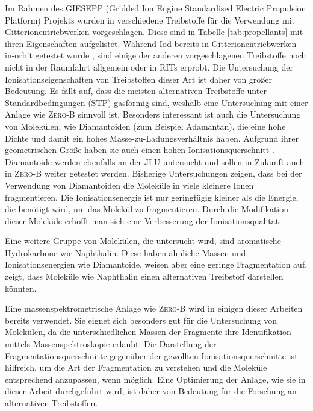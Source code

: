 Im Rahmen des GIESEPP (Gridded Ion Engine Standardised Electric Propulsion Platform) Projekts wurden in \cite{Prop} verschiedene Treibstoffe für die Verwendung mit Gitterionentriebwerken vorgeschlagen. Diese sind in Tabelle \ref{tab:propellants} mit ihren Eigenschaften aufgelistet. Während Iod bereits in Gitterionentriebwerken in-orbit getestet wurde \cite{Iodine}, sind einige der anderen vorgeschlagenen Treibstoffe noch nicht in der Raumfahrt allgemein oder in RITs erprobt. Die Untersuchung der Ionisationseigenschaften von Treibstoffen dieser Art ist daher von großer Bedeutung. Es fällt auf, dass die meisten alternativen Treibstoffe unter Standardbedingungen (STP) gasförmig sind, weshalb eine Untersuchung mit einer Anlage wie \textsc{Zero-B} sinnvoll ist. Besonders interessant ist auch die Untersuchung von Molekülen, wie Diamantoiden (zum Beispiel Adamantan), die eine hohe Dichte und damit ein hohes Masse-zu-Ladungsverhältnis haben. Aufgrund ihrer geometrischen Größe haben sie auch einen hohen Ionisationsquerschnitt \cite{ion}. Diamantoide werden ebenfalls an der JLU untersucht \cite{diamondoids} und sollen in Zukunft auch in \textsc{Zero-B} weiter getestet werden. Bisherige Untersuchungen zeigen, dass bei der Verwendung von Diamantoiden die Moleküle in viele kleinere Ionen fragmentieren. Die Ionisationsenergie ist nur geringfügig kleiner als die Energie, die benötigt wird, um das Molekül zu fragmentieren. Durch die Modifikation dieser Moleküle erhofft man sich eine Verbesserung der Ionisationsqualität. 

Eine weitere Gruppe von Molekülen, die untersucht wird, sind aromatische Hydrokarbone wie Naphthalin. Diese haben ähnliche Massen und Ionisationsenergien wie Diamantoide, weisen aber eine geringe Fragmentation auf. \cite{hydrocarbons} zeigt, dass Moleküle wie Naphthalin einen alternativen Treibstoff darstellen könnten.

Eine massenspektrometrische Anlage wie \textsc{Zero-B} wird in einigen dieser Arbeiten bereits verwendet. Sie eignet sich besonders gut für die Untersuchung von Molekülen, da die unterschiedlichen Massen der Fragmente ihre Identifikation mittels Massenspektroskopie erlaubt. Die Darstellung der Fragmentationsquerschnitte gegenüber der gewollten Ionisationsquerschnitte ist hilfreich, um die Art der Fragmentation zu verstehen und die Moleküle entsprechend anzupassen, wenn möglich. Eine Optimierung der Anlage, wie sie in dieser Arbeit durchgeführt wird, ist daher von Bedeutung für die Forschung an alternativen Treibstoffen.

